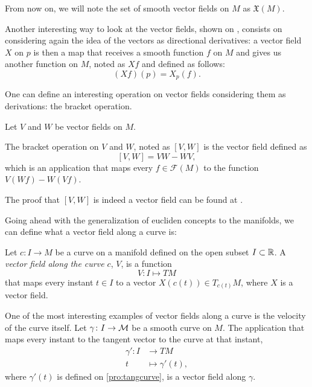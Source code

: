 From now on, we will note the set of smooth vector fields on $M$ as $\mathfrak{X}(M)$.

Another interesting way to look at the vector fields, shown on \cite[p. 23]{docarmo79}, consists on considering again the idea of the vectors as directional derivatives: a vector field $X$ on $p$ is then a map that receives a smooth function $f$ on $M$ and gives us another function on $M$, noted as $Xf$ and defined as follows:
\[
	(Xf)(p) = X_p(f).
\]

One can define an interesting operation on vector fields considering them as derivations: the bracket operation.

\begin{definition}
	Let $V$ and $W$ be vector fields on $M$.
	
	The bracket operation on $V$ and $W$, noted as $[V, W]$ is the vector field defined as
	\[
		[V, W] = VW - WV,
	\]
	which is an application that maps every $f \in \mathcal{F}(M)$ to the function $V(Wf) - W(Vf)$.
\end{definition}

The proof that $[V,W]$ is indeed a vector field can be found at \cite[p. 24]{docarmo79}.

Going ahead with the generalization of eucliden concepts to the manifolds, we can define what a vector field along a curve is:

\begin{definition}
	Let $c \colon I \to M$ be a curve on a manifold defined on the open subset $I \subset \mathbb{R}$. A \emph{vector field along the curve $c$}, $V$, is a function
	\[
	V \colon I \mapsto TM
	\]
	that maps every instant $t \in I$ to a vector $X(c(t)) \in T_{c(t)} M$, where $X$ is a vector field.
\end{definition}

\begin{example}
	One of the most interesting examples of vector fields along a curve is the velocity of the curve itself. Let $\gamma \colon I \to {\mathcal M}$ be a smooth curve on $M$. The application that maps every instant to the tangent vector to the curve at that instant,
	\begin{align*}
		\gamma' \colon I &\to TM \\
		t &\mapsto \gamma'(t),
	\end{align*}
	where $\gamma'(t)$ is defined on \autoref{pro:tangcurve}, is a vector field along $\gamma$.
\end{example}

